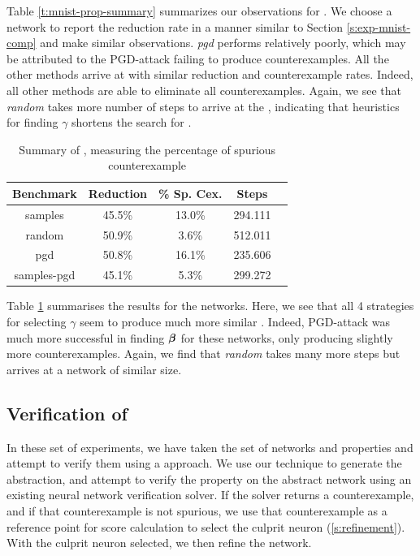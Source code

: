 Table \ref{t:mnist-prop-summary} summarizes our observations for \mnist. We
choose a network to report the reduction rate in a manner similar to Section
\ref{s:exp-mnist-comp} and make similar observations. \textit{pgd} performs
relatively poorly, which may be attributed to the PGD-attack failing to produce
counterexamples. All the other methods arrive at \abs with similar reduction and
counterexample rates. Indeed, all other methods are able to eliminate all
counterexamples. Again, we see that \textit{random} takes more number of steps
to arrive at the \abs, indicating that heuristics for finding $\gamma$ shortens
the search for \abs.

\begin{table}
\begin{tabular}{|c|c|c|c|c|}
\hline
Benchmark   & Reduction  & \% Sp. Cex. & Steps    \\
\hline
samples     & 45.5\%     &  13.0\%     & 294.111  \\
random      & 50.9\%     &  3.6\%      & 512.011  \\
pgd         & 50.8\%     &  16.1\%     & 235.606  \\
samples-pgd & 45.1\%     &  5.3\%      & 299.272  \\
\hline
\end{tabular}
\caption{Summary of \acasxu, measuring the percentage of spurious counterexample }
\label{t:acas-ncex}
\end{table}

Table \ref{t:acas-ncex} summarises the results for the \acasxu networks. Here,
we see that all 4 strategies for selecting $\gamma$ seem to produce much more
similar \abs. Indeed, PGD-attack was much more successful in finding
$\boldsymbol{\beta}$ for these networks, only producing slightly more counterexamples.
Again, we find that \textit{random} takes many more steps but arrives at a
network of similar size.

\subsection{Verification of \acasxu}

In these set of experiments, we have taken the \acasxu set of
networks and properties and attempt to verify them using a \cegar approach. We
use our technique to generate the abstraction, and attempt to verify the
property on the abstract network using an existing neural network verification
solver. If the solver returns a counterexample, and if that counterexample is
not spurious, we use that counterexample as a reference point for score
calculation  to select the culprit neuron (\ref{s:refinement}). With the culprit
neuron selected, we then refine the network.

